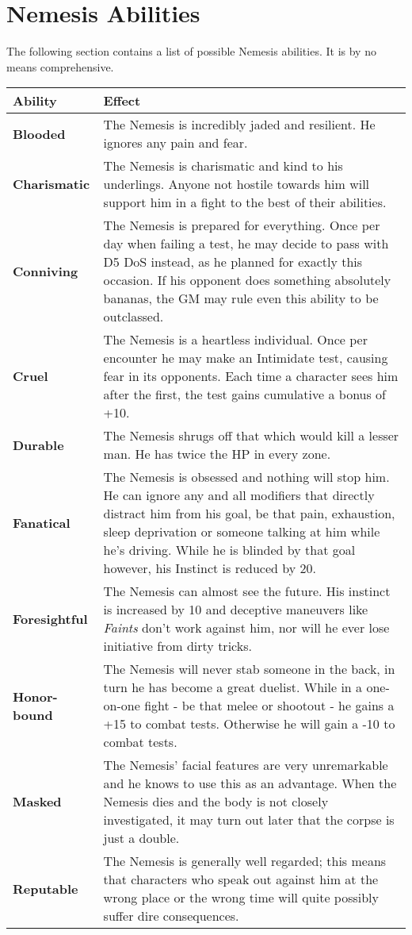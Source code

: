 \documentclass[12pt,a4paper,openany]{book}
\begin{document}
	\section*{Nemesis Abilities}
	The following section contains a list of possible Nemesis abilities. It is by no means comprehensive.\\
	{\setlength{\extrarowheight}{5pt}
	\begin{tabularx}{\textwidth}{l|X}
		Ability & Effect\\
		\hline
		\textbf{Blooded} & The Nemesis is incredibly jaded and resilient. He ignores any pain and fear.\\
		\hline
		\textbf{Charismatic} & The Nemesis is charismatic and kind to his underlings. Anyone not hostile towards him will support him in a fight to the best of their abilities.\\
		\hline
		\textbf{Conniving} & The Nemesis is prepared for everything. Once per day when failing a test, he may decide to pass with D5 DoS instead, as he planned for exactly this occasion. If his opponent does something absolutely bananas, the GM may rule even this ability to be outclassed.\\
		\hline
		\textbf{Cruel} & The Nemesis is a heartless individual. Once per encounter he may make an Intimidate test, causing fear in its opponents. Each time a character sees him after the first, the test gains cumulative a bonus of +10.\\
		\hline
		\textbf{Durable} & The Nemesis shrugs off that which would kill a lesser man. He has twice the HP in every zone.\\
		\hline
		\textbf{Fanatical} & The Nemesis is obsessed and nothing will stop him. He can ignore any and all modifiers that directly distract him from his goal, be that pain, exhaustion, sleep deprivation or someone talking at him while he's driving. While he is blinded by that goal however, his Instinct is reduced by 20.\\
		\hline
		\textbf{Foresightful} & The Nemesis can almost see the future. His instinct is increased by 10 and deceptive maneuvers like \emph{Faints} don't work against him, nor will he ever lose initiative from dirty tricks.\\
		\hline
		\textbf{Honor-bound} & The Nemesis will never stab someone in the back, in turn he has become a great duelist. While in a one-on-one fight - be that melee or shootout - he gains a +15 to combat tests. Otherwise he will gain a -10 to combat tests.\\
		\hline
		\textbf{Masked} & The Nemesis' facial features are very unremarkable and he knows to use this as an advantage. When the Nemesis dies and the body is not closely investigated, it may turn out later that the corpse is just a double.\\
		\hline
		\textbf{Reputable} & The Nemesis is generally well regarded; this means that characters who speak out against him at the wrong place or the wrong time will quite possibly suffer dire consequences.
	\end{tabularx}}
	
\end{document}
